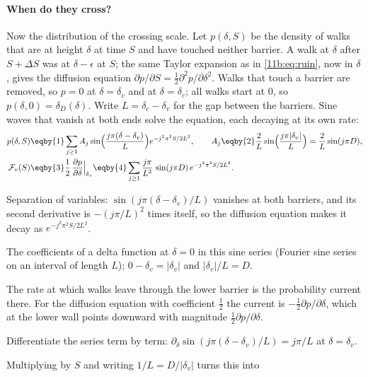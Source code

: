 \paragraph{When do they cross?}
Now the distribution of the crossing scale. Let $p(\delta,S)$ be the density of
walks that are at height $\delta$ at time $S$ and have touched neither barrier. A
walk at $\delta$ after $S+\Delta S$ was at $\delta-\epsilon$ at $S$; the same
Taylor expansion as in \eqref{11b:eq:ruin}, now in $\delta$, gives the diffusion
equation $\partial p/\partial S=\frac12\partial^2p/\partial\delta^2$. Walks that
touch a barrier are removed, so $p=0$ at $\delta=\delta_v$ and at $\delta=\delta_c$;
all walks start at $0$, so $p(\delta,0)=\delta_D(\delta)$. Write $L=\delta_c-\delta_v$
for the gap between the barriers. Sine waves that vanish at both ends solve the
equation, each decaying at its own rate:
\begin{align}
  p(\delta,S)
  &\eqby{1}\sum_{j\ge1}A_j\sin\Bigl(\frac{j\pi(\delta-\delta_v)}{L}\Bigr)
     e^{-j^2\pi^2S/2L^2},
  \qquad
  A_j\eqby{2}\frac2L\sin\Bigl(\frac{j\pi|\delta_v|}{L}\Bigr)=\frac2L\sin(j\pi D),\nonumber\\
  \mathcal F_v(S)
  &\eqby{3}\frac12\,\frac{\partial p}{\partial\delta}\Big|_{\delta_v}
   \eqby{4}\sum_{j\ge1}\frac{j\pi}{L^2}\,\sin(j\pi D)\,e^{-j^2\pi^2S/2L^2}.
  \label{11b:eq:svdw-derive}
\end{align}
\begin{explain}
  \item Separation of variables: $\sin(j\pi(\delta-\delta_v)/L)$ vanishes at both
        barriers, and its second derivative is $-(j\pi/L)^2$ times itself, so the
        diffusion equation makes it decay as $e^{-j^2\pi^2S/2L^2}$.
  \item The coefficients of a delta function at $\delta=0$ in this sine series
        (Fourier sine series on an interval of length $L$); $0-\delta_v=|\delta_v|$
        and $|\delta_v|/L=D$.
  \item The rate at which walks leave through the lower barrier is the
        probability current there. For the diffusion equation with coefficient
        $\frac12$ the current is $-\frac12\partial p/\partial\delta$, which at the
        lower wall points downward with magnitude $\frac12\partial p/\partial\delta$.
  \item Differentiate the series term by term:
        $\partial_\delta\sin(j\pi(\delta-\delta_v)/L)=j\pi/L$ at $\delta=\delta_v$.
\end{explain}
Multiplying by $S$ and writing $1/L=D/|\delta_v|$ turns this into
